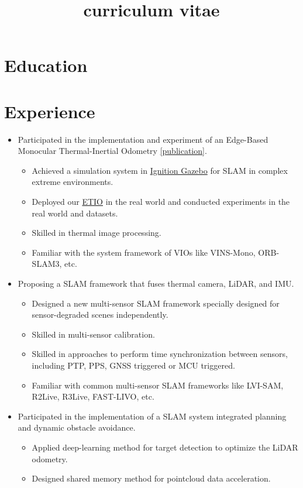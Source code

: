 \documentclass[11pt,a4paper]{moderncv}        %
\title{curriculum vitae}
\begin{document}

\makecvtitle 

\section{Education}


\section{Experience}

%
{
\begin{itemize}%
\item Participated in the implementation and experiment of an Edge-Based Monocular Thermal-Inertial Odometry \hyperref[sec:Publications]{[publication]}.
\begin{itemize}%
\hypersetup{urlcolor=black}
\item Achieved a simulation system in \href{https://gazebosim.org/api/gazebo/2.10/index.html}{Ignition Gazebo} for SLAM in complex extreme environments.
\item Deployed our \hyperref[sec:Publications]{ETIO} in the real world and conducted experiments in the real world and datasets.
\item Skilled in thermal image processing.
\item Familiar with the system framework of VIOs like VINS-Mono, ORB-SLAM3, etc.
\end{itemize}
\item Proposing a SLAM framework that fuses thermal camera, LiDAR, and IMU.
\begin{itemize}%
\item Designed a new multi-sensor SLAM framework specially designed for sensor-degraded scenes independently. 
\item Skilled in multi-sensor calibration.
\item Skilled in approaches to perform time synchronization between sensors, including PTP, PPS, GNSS triggered or MCU triggered.
\item Familiar with common multi-sensor SLAM frameworks like LVI-SAM, R2Live, R3Live, FAST-LIVO, etc.
\end{itemize}
\item Participated in the implementation of a SLAM system integrated planning and dynamic obstacle avoidance.
\begin{itemize}%
\item Applied deep-learning method for target detection to optimize the LiDAR odometry.
\item Designed shared memory method for pointcloud data acceleration.
\end{itemize}
\end{itemize}
}
\end{document}
